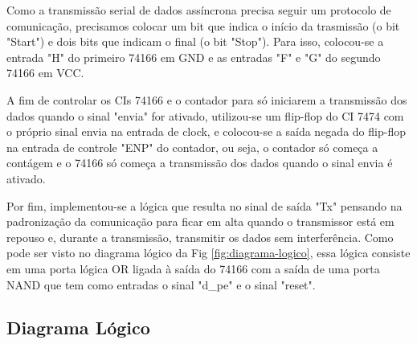 \documentclass[a4,12pt]{horizon-theme}
\begin{document}
Como a transmissão serial de dados assíncrona precisa seguir um protocolo de comunicação, precisamos colocar um bit que indica o início da trasmissão (o bit "Start") e dois bits que indicam o final (o bit "Stop"). Para isso, colocou-se a entrada "H" do primeiro 74166 em GND e as entradas "F" e "G" do segundo 74166 em VCC.

A fim de controlar os CIs 74166 e o contador para só iniciarem a transmissão dos dados quando o sinal "envia" for ativado, utilizou-se um flip-flop do CI 7474 com o próprio sinal envia na entrada de clock, e colocou-se a saída negada do flip-flop na entrada de controle "ENP" do contador, ou seja, o contador só começa a contágem e o 74166 só começa a transmissão dos dados quando o sinal envia é ativado.

Por fim, implementou-se a lógica que resulta no sinal de saída "Tx" pensando na padronização da comunicação para ficar em alta quando o transmissor está em repouso e, durante a transmissão, transmitir os dados sem interferência. Como pode ser visto no diagrama lógico da Fig \ref{fig:diagrama-logico}, essa lógica consiste em uma porta lógica OR ligada à saída do 74166 com a saída de uma porta NAND que tem como entradas o sinal "d\_pe" e o sinal "reset".

\newpage
\subsection{Diagrama Lógico}
\label{sec:diagrama-logico}
\end{document}
